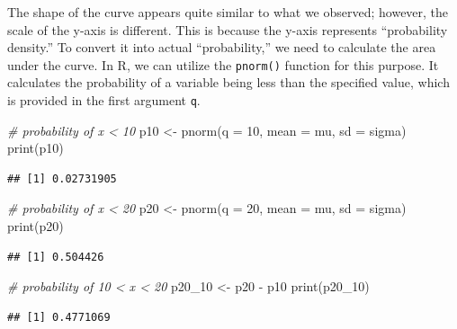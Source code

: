 \documentclass[
]{article}
\newenvironment{Shaded}{\begin{snugshade}}{\end{snugshade}}
\newcommand{\AttributeTok}[1]{\textcolor[rgb]{0.77,0.63,0.00}{#1}}
\newcommand{\CommentTok}[1]{\textcolor[rgb]{0.56,0.35,0.01}{\textit{#1}}}
\newcommand{\DecValTok}[1]{\textcolor[rgb]{0.00,0.00,0.81}{#1}}
\newcommand{\FunctionTok}[1]{\textcolor[rgb]{0.00,0.00,0.00}{#1}}
\newcommand{\NormalTok}[1]{#1}
\newcommand{\OtherTok}[1]{\textcolor[rgb]{0.56,0.35,0.01}{#1}}
\newcommand{\SpecialCharTok}[1]{\textcolor[rgb]{0.00,0.00,0.00}{#1}}
\begin{document}
The shape of the curve appears quite similar to what we observed; however, the scale of the y-axis is different. This is because the y-axis represents ``probability density.'' To convert it into actual ``probability,'' we need to calculate the area under the curve. In R, we can utilize the \texttt{pnorm()} function for this purpose. It calculates the probability of a variable being less than the specified value, which is provided in the first argument \texttt{q}.

\begin{Shaded}
\begin{Highlighting}[]
\CommentTok{\# probability of x \textless{} 10}
\NormalTok{p10 }\OtherTok{\textless{}{-}} \FunctionTok{pnorm}\NormalTok{(}\AttributeTok{q =} \DecValTok{10}\NormalTok{, }\AttributeTok{mean =}\NormalTok{ mu, }\AttributeTok{sd =}\NormalTok{ sigma)}
\FunctionTok{print}\NormalTok{(p10)}
\end{Highlighting}
\end{Shaded}

\begin{verbatim}
## [1] 0.02731905
\end{verbatim}

\begin{Shaded}
\begin{Highlighting}[]
\CommentTok{\# probability of x \textless{} 20}
\NormalTok{p20 }\OtherTok{\textless{}{-}} \FunctionTok{pnorm}\NormalTok{(}\AttributeTok{q =} \DecValTok{20}\NormalTok{, }\AttributeTok{mean =}\NormalTok{ mu, }\AttributeTok{sd =}\NormalTok{ sigma)}
\FunctionTok{print}\NormalTok{(p20)}
\end{Highlighting}
\end{Shaded}

\begin{verbatim}
## [1] 0.504426
\end{verbatim}

\begin{Shaded}
\begin{Highlighting}[]
\CommentTok{\# probability of 10 \textless{} x \textless{} 20}
\NormalTok{p20\_10 }\OtherTok{\textless{}{-}}\NormalTok{ p20 }\SpecialCharTok{{-}}\NormalTok{ p10}
\FunctionTok{print}\NormalTok{(p20\_10)}
\end{Highlighting}
\end{Shaded}

\begin{verbatim}
## [1] 0.4771069
\end{verbatim}
\end{document}
